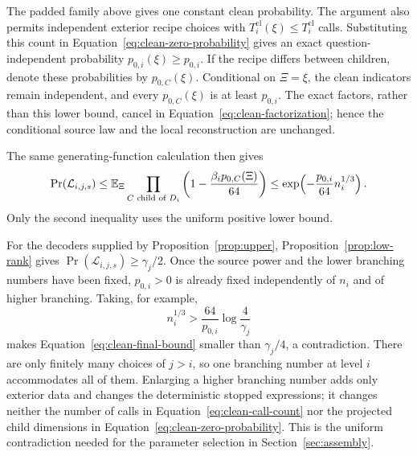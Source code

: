 \begin{remark}
The padded family above gives one constant clean probability.  The argument
also permits independent exterior recipe choices with
$T_i^{\mathrm{cl}}(\xi)\le T_i^{\mathrm{cl}}$ calls.  Substituting this
count in Equation~\eqref{eq:clean-zero-probability} gives an exact
question-independent probability $p_{0,i}(\xi)\ge p_{0,i}$.
If the recipe differs between children, denote these probabilities by
$p_{0,C}(\xi)$.  Conditional on $\Xi=\xi$, the clean indicators remain
independent, and every $p_{0,C}(\xi)$ is at least $p_{0,i}$.
The exact factors, rather than this lower bound, cancel in
Equation~\eqref{eq:clean-factorization}; hence the conditional source law
and the local reconstruction are unchanged.

The same generating-function calculation then gives
\begin{equation}
 \Pr(\mathcal L_{i,j,s})
 \le \mathbb E_\Xi\prod_{C\text{ child of }D_i}
       \left(1-\frac{\beta_i p_{0,C}(\Xi)}{64}\right)
 \le \exp\!\left(-\frac{p_{0,i}}{64}n_i^{1/3}\right).
 \label{eq:clean-exterior-average}
\end{equation}
Only the second inequality uses the uniform positive lower bound.
\end{remark}

For the decoders supplied by Proposition~\ref{prop:upper},
Proposition~\ref{prop:low-rank} gives
$\Pr(\mathcal L_{i,j,s})\ge\gamma_j/2$.  Once the source power and
the lower branching numbers have been fixed,
$p_{0,i}>0$ is already fixed independently of $n_i$ and of higher
branching.  Taking, for example,
\[
 n_i^{1/3}>\frac{64}{p_{0,i}}\log\frac{4}{\gamma_j}
\]
makes Equation~\eqref{eq:clean-final-bound} smaller than
$\gamma_j/4$, a contradiction.  There are only finitely many choices
of $j>i$, so one branching number at level $i$ accommodates all of
them.  Enlarging a higher branching number adds only exterior data
and changes the deterministic stopped expressions; it changes
neither the number of calls in Equation~\eqref{eq:clean-call-count}
nor the projected child dimensions in
Equation~\eqref{eq:clean-zero-probability}.  This is the uniform
contradiction needed for the parameter selection in
Section~\ref{sec:assembly}.

